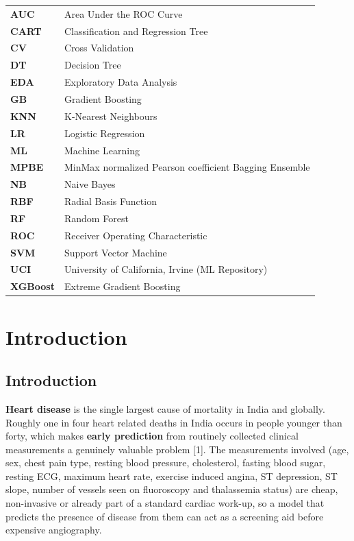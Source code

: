 \documentclass[12pt,a4paper,oneside]{report}
\begin{document}
\begin{tabular}{ll}
\textbf{AUC} & Area Under the ROC Curve \\
\textbf{CART} & Classification and Regression Tree \\
\textbf{CV} & Cross Validation \\
\textbf{DT} & Decision Tree \\
\textbf{EDA} & Exploratory Data Analysis \\
\textbf{GB} & Gradient Boosting \\
\textbf{KNN} & K-Nearest Neighbours \\
\textbf{LR} & Logistic Regression \\
\textbf{ML} & Machine Learning \\
\textbf{MPBE} & MinMax normalized Pearson coefficient Bagging Ensemble \\
\textbf{NB} & Naive Bayes \\
\textbf{RBF} & Radial Basis Function \\
\textbf{RF} & Random Forest \\
\textbf{ROC} & Receiver Operating Characteristic \\
\textbf{SVM} & Support Vector Machine \\
\textbf{UCI} & University of California, Irvine (ML Repository) \\
\textbf{XGBoost} & Extreme Gradient Boosting \\
\end{tabular}

\clearpage
{}
\chapter{Introduction}
\section{Introduction}
\textbf{Heart disease} is the single largest cause of mortality in India and globally. Roughly one in four heart related deaths in India occurs in people younger than forty, which makes \textbf{early prediction} from routinely collected clinical measurements a genuinely valuable problem [1]. The measurements involved (age, sex, chest pain type, resting blood pressure, cholesterol, fasting blood sugar, resting ECG, maximum heart rate, exercise induced angina, ST depression, ST slope, number of vessels seen on fluoroscopy and thalassemia status) are cheap, non-invasive or already part of a standard cardiac work-up, so a model that predicts the presence of disease from them can act as a screening aid before expensive angiography.
\end{document}
